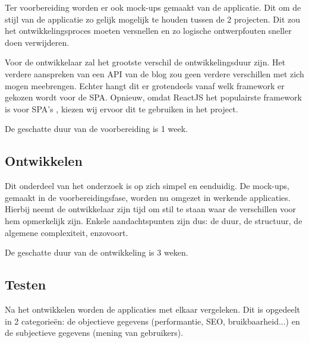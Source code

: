 \documentclass{hogent-article}
\begin{document}
Ter voorbereiding worden er ook mock-ups gemaakt van de applicatie.
Dit om de stijl van de applicatie zo gelijk mogelijk te houden tussen de 2 projecten.
Dit zou het ontwikkelingsproces moeten versnellen en zo logische ontwerpfouten sneller doen verwijderen.

Voor de ontwikkelaar zal het grootste verschil de ontwikkelingsduur zijn.
Het verdere aanspreken van een API van de blog zou geen verdere verschillen met zich mogen meebrengen.
Echter hangt dit er grotendeels vanaf welk framework er gekozen wordt voor de SPA.
Opnieuw, omdat ReactJS het populairste framework is voor SPA's \autocite{Gathoni2022}, kiezen wij ervoor dit te gebruiken in het project.

De geschatte duur van de voorbereiding is 1 week.

\subsection{Ontwikkelen}
Dit onderdeel van het onderzoek is op zich simpel en eenduidig.
De mock-ups, gemaakt in de voorbereidingsfase, worden nu omgezet in werkende applicaties.
Hierbij neemt de ontwikkelaar zijn tijd om stil te staan waar de verschillen voor hem opmerkelijk zijn.
Enkele aandachtspunten zijn dus:
de duur,
de structuur,
de algemene complexiteit,
enzovoort.

De geschatte duur van de ontwikkeling is 3 weken.

\subsection{Testen}
Na het ontwikkelen worden de applicaties met elkaar vergeleken.
Dit is opgedeelt in 2 categorieën:
de objectieve gegevens (performantie, SEO, bruikbaarheid...) en de subjectieve gegevens (mening van gebruikers).
\end{document}
